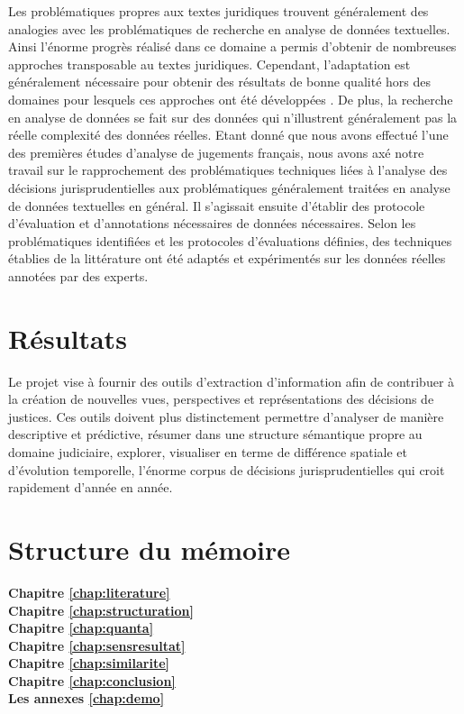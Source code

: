 Les problématiques propres aux textes juridiques trouvent généralement des analogies avec les problématiques de recherche en analyse de données textuelles. Ainsi l'énorme progrès réalisé dans ce domaine a permis d'obtenir de nombreuses approches transposable au textes juridiques. Cependant, l'adaptation est généralement nécessaire pour obtenir des résultats de bonne qualité hors des domaines pour lesquels ces approches ont été développées \citep{Waltl2016lexia}. De plus, la recherche en analyse de données se fait sur des données qui n'illustrent généralement pas la réelle complexité des données réelles. Etant donné que nous avons effectué l'une des premières études d'analyse de jugements français, nous avons axé notre travail sur le rapprochement des problématiques techniques liées à l'analyse des décisions jurisprudentielles aux problématiques généralement traitées en analyse de données textuelles en général. Il s'agissait ensuite d'établir des protocole d'évaluation et d'annotations nécessaires de données nécessaires. Selon les problématiques identifiées et les protocoles d'évaluations définies, des techniques établies de la littérature ont été adaptés et expérimentés sur les données réelles annotées par des experts.

\section{Résultats}
\label{sec:intro:résultats}
Le projet vise à fournir des outils d'extraction d'information afin de contribuer à la création de nouvelles vues, perspectives et représentations des décisions de justices. Ces outils doivent plus distinctement permettre d'analyser de manière descriptive et prédictive, résumer dans une structure sémantique propre au domaine judiciaire, explorer, visualiser en terme de différence spatiale et d'évolution temporelle, l'énorme corpus de décisions jurisprudentielles qui croit rapidement d'année en année.

\section{Structure du mémoire}
\label{sec:intro:organisation}

\textbf{Chapitre \ref{chap:literature}} \\[0.2em]

\textbf{Chapitre \ref{chap:structuration}} \\[0.2em]

\textbf{Chapitre \ref{chap:quanta}} \\[0.2em]

\textbf{Chapitre \ref{chap:sensresultat}} \\[0.2em]

\textbf{Chapitre \ref{chap:similarite}} \\[0.2em]

\textbf{Chapitre \ref{chap:conclusion}} \\[0.2em]

\textbf{Les annexes \ref{chap:demo}} \\[0.2em]
